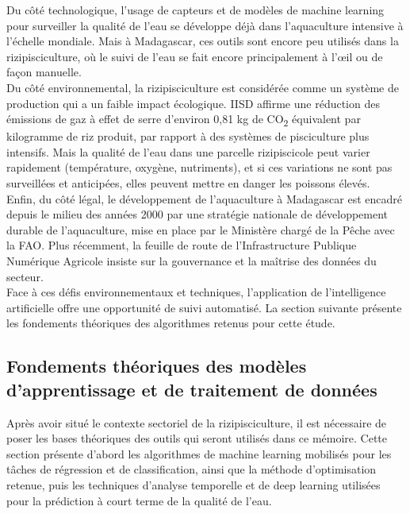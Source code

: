\documentclass[a4paper,12pt, oneside]{article}
\begin{document}
Du côté technologique, l'usage de capteurs et de modèles de machine learning pour surveiller la qualité de l'eau se développe déjà dans l'aquaculture intensive à l'échelle mondiale. Mais à Madagascar, ces outils sont encore peu utilisés dans la rizipisciculture, où le suivi de l'eau se fait encore principalement à l'œil ou de façon manuelle.\\

Du côté environnemental, la rizipisciculture est considérée comme un système de production qui a un faible impact écologique. IISD affirme une réduction des émissions de gaz à effet de serre d'environ 0,81 kg de CO\textsubscript{2} équivalent par kilogramme de riz produit, par rapport à des systèmes de pisciculture plus intensifs. Mais la qualité de l'eau dans une parcelle rizipiscicole peut varier rapidement (température, oxygène, nutriments), et si ces variations ne sont pas surveillées et anticipées, elles peuvent mettre en danger les poissons élevés.\\

Enfin, du côté légal, le développement de l'aquaculture à Madagascar est encadré depuis le milieu des années 2000 par une stratégie nationale de développement durable de l'aquaculture, mise en place par le Ministère chargé de la Pêche avec la FAO. Plus récemment, la feuille de route de l'Infrastructure Publique Numérique Agricole insiste sur la gouvernance et la maîtrise des données du secteur.\\

Face à ces défis environnementaux et techniques, l'application de l'intelligence artificielle offre une opportunité de suivi automatisé. La section suivante présente les fondements théoriques des algorithmes retenus pour cette étude.

\subsection{Fondements théoriques des modèles d'apprentissage et de traitement de données}

Après avoir situé le contexte sectoriel de la rizipisciculture, il est nécessaire de poser les bases théoriques des outils qui seront utilisés dans ce mémoire. Cette section présente d'abord les algorithmes de machine learning mobilisés pour les tâches de régression et de classification, ainsi que la méthode d'optimisation retenue, puis les techniques d'analyse temporelle et de deep learning utilisées pour la prédiction à court terme de la qualité de l'eau.\\
\end{document}
